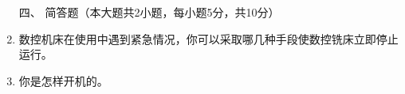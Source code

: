 \documentclass[12pt,twocolumn,landscape,UTF8,twoside]{ctexart}
\begin{document}
\begin{spacing}{1.3}
\begin{enumerate} [1、]
\item[\heiti 四、]{\heiti 简答题（本大题共2小题，每小题5分，共10分）}

%
%
%
	
	
\item 数控机床在使用中遇到紧急情况，你可以采取哪几种手段使数控铣床立即停止运行。
\item 你是怎样开机的。
%
%
%
%
%
%
%
%
%
%
%
%
%
%
%
%
%
%
%
%
%
%
%
%
%


\end{enumerate}
\end{spacing}
\end{document}
